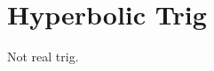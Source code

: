 \documentclass{article}
\begin{document}




\section{Hyperbolic Trig}
Not real trig.
\end{document}
